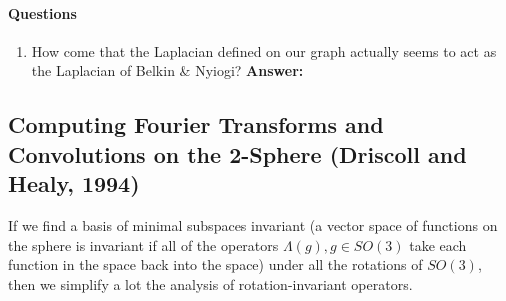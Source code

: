 \paragraph{Questions}
\begin{enumerate}
	\item How come that the Laplacian defined on our graph actually seems to act as the Laplacian of Belkin \& Nyiogi? \bf{Answer}: 
\end{enumerate}
\subsection{Computing Fourier Transforms and Convolutions on the 2-Sphere (Driscoll and Healy, 1994)}
If we find a basis of minimal subspaces invariant (a vector space of functions on the sphere is invariant if all of the operators $\Lambda(g), g\in SO(3)$ take each function in the space back into the space) under all the rotations of $SO(3)$, then we simplify a lot the analysis of rotation-invariant operators.
